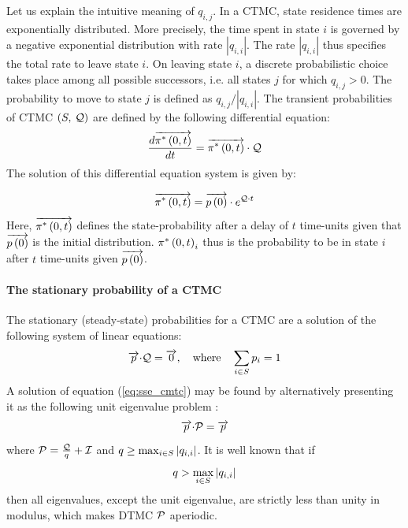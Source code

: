 \documentclass[a4paper,11pt]{article}
\begin{document}
		Let us explain the intuitive meaning of $q_{i,j}$.  In a CTMC, state residence times are exponentially distributed.  More precisely, the time spent in state $i$ is governed by a negative exponential distribution with rate $|q_{i,i}|$.  The rate $|q_{i,i}|$ thus specifies the total rate to leave state $i$.  On leaving state $i$, a discrete probabilistic choice takes place among all possible successors, i.e. all states $j$ for which $q_{i,j} > 0$.  The probability to move to state $j$ is defined as $q_{i,j} / |q_{i,i}|$.  The transient probabilities of CTMC $\left( S,\: \mathcal{Q} \right)$ are defined by the following differential equation:
		  \begin{equation}
			\frac{d \overrightarrow{\pi^{*} \left(0, t \right )}}{dt} = \overrightarrow{\pi^{*} \left(0, t \right )} \cdot \mathcal{Q} \nonumber
		  \end{equation}
		The solution of this differential equation system is given by:
		
		\begin{equation}
			\overrightarrow{\pi^{*} \left(0, t \right )} = \overrightarrow{p \left( 0 \right)} \cdot e^{\mathcal{Q}{\cdot}t}
			\label{eq:transient}
		\end{equation}
		Here, $\overrightarrow{\pi^{*} \left(0, t \right )}$ defines the state-probability after a delay of $t$ time-units given that  $\overrightarrow{p \left( 0 \right)}$ is the initial distribution.  $\pi^{*} \left(0, t \right )_{i}$ thus is the probability to be in state $i$ after $t$ time-units given $\overrightarrow{p \left( 0 \right)}$.

	\paragraph{The stationary probability of a CTMC}
		The stationary (steady-state) probabilities for a CTMC are a solution of the following system of linear equations:
		\begin{equation}
			\overrightarrow{p} {\cdot} \mathcal{Q} = \overrightarrow{0}, \quad \text{where} \quad \sum_{i \in S} p_{i} = 1
			\label{eq:sse_cmtc}
		\end{equation}
		A solution of equation (\ref{eq:sse_cmtc}) may be found by alternatively presenting it as the following unit eigenvalue problem \cite{Stewart_ACM78}:
		\begin{equation}
			\overrightarrow{p}{\cdot}\mathcal{P} = \overrightarrow{p}
			\label{eq:sse_u_ctmc}
		\end{equation}
		where $\mathcal{P}=\frac{\mathcal{Q}}{q}+\mathcal{I}$ and $q \geq \max_{i \in S}| q_{i,i} |$.  It is well known \cite{Stewart_ACM78} that if
		\begin{equation}
			q > \max_{i \in S} |q_{i,i}|
			\label{eq:unif_rate}
		\end{equation}
		then all eigenvalues, except the unit eigenvalue, are strictly less than unity in modulus, which makes DTMC $\mathcal{P}$ aperiodic.
\end{document}
